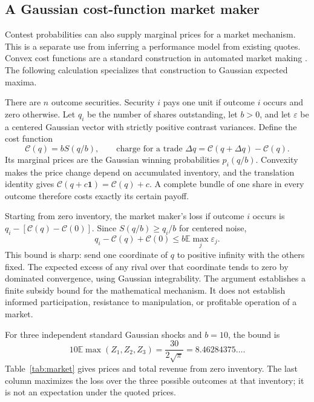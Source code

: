 \documentclass[11pt]{amsart}
\newcommand{\E}{\mathbb E}
\newcommand{\one}{\mathbf 1}
\theoremstyle{definition}
\begin{document}
\subsection{A Gaussian cost-function market maker}
Contest probabilities can also supply marginal prices for a market mechanism. This is a separate use from inferring a performance model from existing quotes. Convex cost functions are a standard construction in automated market making \cite{abernethy2013}. The following calculation specializes that construction to Gaussian expected maxima.

There are $n$ outcome securities. Security $i$ pays one unit if outcome $i$ occurs and zero otherwise. Let $q_i$ be the number of shares outstanding, let $b>0$, and let $\varepsilon$ be a centered Gaussian vector with strictly positive contrast variances. Define the cost function
\begin{equation}\label{eq:market_cost}
 \mathcal C(q)=bS(q/b),\qquad
 \text{charge for a trade }\Delta q=\mathcal C(q+\Delta q)-\mathcal C(q).
\end{equation}
Its marginal prices are the Gaussian winning probabilities $p_i(q/b)$. Convexity makes the price change depend on accumulated inventory, and the translation identity gives
$\mathcal C(q+c\one)=\mathcal C(q)+c$. A complete bundle of one share in every outcome therefore costs exactly its certain payoff.

Starting from zero inventory, the market maker's loss if outcome $i$ occurs is
$q_i-[\mathcal C(q)-\mathcal C(0)]$. Since $S(q/b)\geq q_i/b$ for centered noise,
\begin{equation}\label{eq:loss_bound}
 q_i-\mathcal C(q)+\mathcal C(0)\leq b\E\max_j\varepsilon_j.
\end{equation}
This bound is sharp: send one coordinate of $q$ to positive infinity with the others fixed. The expected excess of any rival over that coordinate tends to zero by dominated convergence, using Gaussian integrability. The argument establishes a finite subsidy bound for the mathematical mechanism. It does not establish informed participation, resistance to manipulation, or profitable operation of a market.

For three independent standard Gaussian shocks and $b=10$, the bound is
\[
 10\E\max(Z_1,Z_2,Z_3)=\frac{30}{2\sqrt{\pi}}=8.46284375\ldots.
\]
Table~\ref{tab:market} gives prices and total revenue from zero inventory. The last column maximizes the loss over the three possible outcomes at that inventory; it is not an expectation under the quoted prices.
\end{document}

